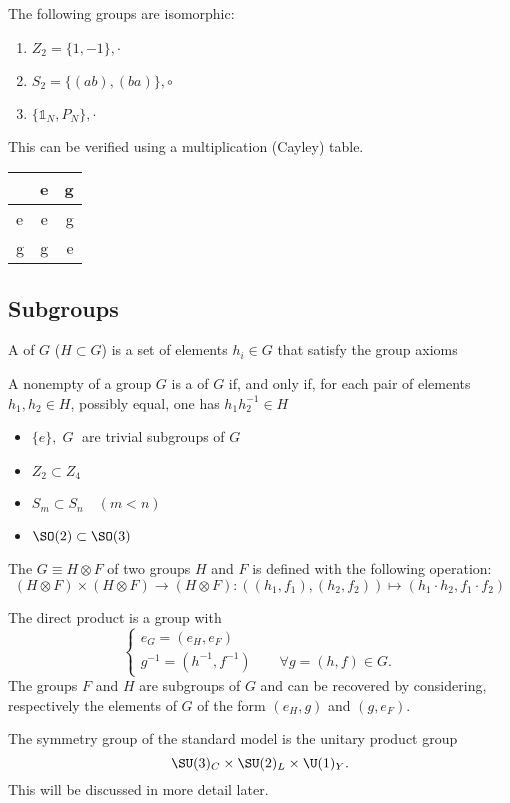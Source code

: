 \begin{example}
The following groups are isomorphic:
\begin{enumerate}
\item $Z_2 = \{1,-1\}, \cdot$
\item $S_2 = \{(ab), (ba)\}, \circ$
\item $\{ \mathbb{1}_N, P_N\}, \cdot$
\end{enumerate}
This can be verified using a multiplication (Cayley) table.
\begin{center}
  \begin{tabular}{ l | c | r }
     & e & g \\ \hline
    e & e & g \\ \hline
    g & g & e \\
  \end{tabular}
\end{center}
\end{example}

\subsection{Subgroups}
\begin{definition}
A  of $G$ ($H\subset G$) is a set of elements $h_i\in G$ that satisfy the group axioms
\end{definition}
\begin{eigenschap}
A nonempty  of a group $G$ is a  of $G$ if, and only if, for each pair of elements $h_1,h_2 \in H$, possibly equal, one has $h_1h_2^{-1} \in H$
\end{eigenschap}
\begin{example}
\begin{itemize}
\item $\{e\}, \;G\;$ are trivial subgroups of $G$
\item $Z_2 \subset Z_4$
\item $S_m \subset S_n \quad (m<n)$
\item $\SO(2) \subset \SO(3)$
\end{itemize}
\end{example}
\begin{definition}
The  $G \equiv H\otimes F$ of two groups $H$ and $F$ is defined with the following operation:
\[ (H\otimes F) \times (H\otimes F) \rightarrow (H\otimes F): ((h_1,f_1),(h_2,f_2)) \mapsto (h_1\cdot h_2, f_1\cdot f_2)\]
\end{definition}
The direct product is a group with
\[ \begin{cases}
e_G = (e_H,e_F) \\
g^{-1} = (h^{-1}, f^{-1})\qquad \forall g = (h,f) \in G.
\end{cases} \]
The groups $F$ and $H$ are subgroups of $G$ and can be recovered by considering, respectively the elements of $G$ of the form $(e_H, g)$ and $(g ,e_F)$.
\begin{example}
The symmetry group of the standard model is the unitary product group
\[\SU(3)_C\times \SU(2)_L \times \U(1)_Y.\]
This will be discussed in more detail later.
\end{example}


